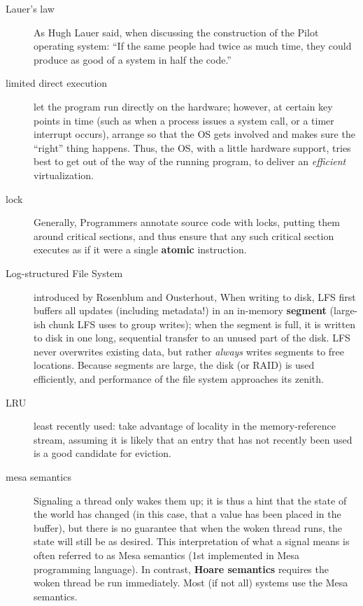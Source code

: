 \begin{description}
\item[Lauer's law] As Hugh Lauer said, when discussing the construction of the Pilot operating system: ``If the same people had twice as much time, they could produce as good of a system in half the code.''

\item[limited direct execution] let the program run directly on the hardware; however, at certain key points in time (such as when a process issues a system call, or a timer interrupt occurs), arrange so that the OS gets involved and makes sure the ``right'' thing happens.   Thus, the OS, with a little hardware support, tries best to get out of the way of the running program, to deliver an \emph{efficient} virtualization.

\item[lock] Generally, Programmers annotate source code with locks, putting them around critical sections, and thus ensure that any such critical section executes as if it were a single \textbf{atomic} instruction.

\item[Log-structured File System] introduced by Rosenblum and Ousterhout, When writing to disk, LFS first buffers all updates (including metadata!) in an in-memory \textbf{segment} (large-ish chunk LFS uses to group writes); when the segment is full, it is written to disk in one long, sequential transfer to an unused part of the disk. LFS never overwrites existing data, but rather \emph{always} writes segments to free locations. Because segments are large, the disk (or RAID) is used efficiently, and performance of the file system approaches its zenith.

\item[LRU] least recently used: take advantage of locality in the memory-reference stream, assuming it is likely that an entry that has not recently been used is a good
candidate for eviction.

\item[mesa semantics] Signaling a thread only wakes them up; it is thus a hint that the state of the world has changed (in this case, that a value has been placed in the buffer), but there is no guarantee that when the woken thread runs, the state will still be as desired. This interpretation of what a signal means is often referred to as Mesa semantics (1st implemented in Mesa programming language). In contrast, \textbf{Hoare semantics} requires the woken thread be run immediately.  Most (if not all) systems use the Mesa semantics.


\end{description}
